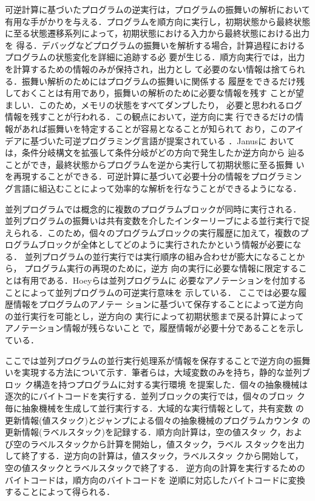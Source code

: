\documentclass[submit,PRO]{ipsj}
\begin{document}
可逆計算に基づいたプログラムの逆実行は，プログラムの振舞いの解析において
有用な手がかりを与える．プログラムを順方向に実行し，初期状態から最終状態
に至る状態遷移系列によって，初期状態における入力から最終状態における出力を
得る．デバッグなどプログラムの振舞いを解析する場合，計算過程における
プログラムの状態変化を詳細に追跡する必
要が生じる．順方向実行では，出力を計算するための情報のみが保持され，出力とし
て必要のない情報は捨てられる．振舞い解析のためにはプログラムの振舞いに関係する
履歴をできるだけ残しておくことは有用であり，振舞いの解析のために必要な情報を残す
ことが望ましい．このため，メモリの状態をすべてダンプしたり，
必要と思われるログ情報を残すことが行われる．この観点において，逆方向に実
行できるだけの情報があれば振舞いを特定することが容易となることが知られて
おり，このアイデアに基づいた可逆プログラミング言語が提案されている
\cite{DBLP:journals/entcs/Yokoyama10,DBLP:conf/ifl/ThomsenA15}．Janusに
おいては，条件分岐構文を拡張して条件分岐がどの方向で発生したか逆方向から
辿ることができ，最終状態からプログラムを逆から実行して初期状態に至る振舞
いを再現することができる．可逆計算に基づいて必要十分の情報をプログラミン
グ言語に組込むことによって効率的な解析を行なうことができるようになる．

並列プログラムでは概念的に複数のプログラムブロックが同時に実行される．
並列プログラムの振舞いは共有変数を介したインターリーブによる並行実行で捉
えられる．このため，個々のプログラムブロックの実行履歴に加えて，複数のプ
ログラムブロックが全体としてどのように実行されたかという情報が必要になる．
並列プログラムの並行実行では実行順序の組み合わせが膨大になることから，
プログラム実行の再現のために，逆方
向の実行に必要な情報に限定することは有用である．Hoeyらは並列プログラムに
必要なアノテーションを付加することによって並列プログラムの可逆実行意味を
示している\cite{DBLP:journals/corr/abs-1808-08651,Hoey20PHD}．
ここでは必要な履歴情報をプログラムのアノテー
ションに基づいて保存することによって逆方向の並行実行を可能とし，逆方向の
実行によって初期状態まで戻る計算によってアノテーション情報が残らないこと
で，履歴情報が必要十分であることを示している．

ここでは並列プログラムの並行実行処理系が情報を保存することで逆方向の振舞
いを実現する方法について示す．筆者らは，大域変数のみを持ち，静的な並列ブロッ
ク構造を持つプログラムに対する実行環境
を提案した\cite{DBLP:conf/rc/IkedaY20}．個々の抽象機械は逐次的にバイトコードを実行する．並列ブロックの実行では，個々のブロッ
ク毎に抽象機械を生成して並行実行する．大域的な実行情報として，共有変数
の更新情報(値スタック)とジャンプによる個々の抽象機械のプログラムカウンタ
の更新情報(ラベルスタック)を記録する．順方向計算は，空の値スタッ
ク，および空のラベルスタックから計算を開始し，値スタック，ラベル
スタックを出力して終了する．逆方向の計算は，値スタック，ラベルスタッ
クから開始して，空の値スタックとラベルスタックで終了する．
逆方向の計算を実行するためのバイトコードは，順方向のバイトコードを
逆順に対応したバイトコードに変換することによって得られる．
\end{document}
